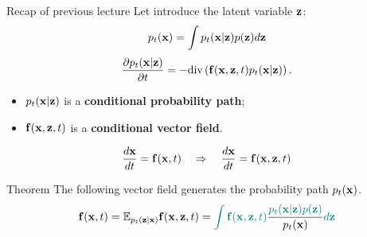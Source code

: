 \begin{frame}{Recap of previous lecture}
	\vspace{-0.3cm}
	Let introduce the latent variable $\mathbf{z}$:
	\[
		p_t(\mathbf{x}) = \int p_t(\mathbf{x} | \mathbf{z}) p(\mathbf{z}) d \mathbf{z} 
	\]
	\vspace{-0.5cm}
	\[
		\frac{\partial p_t(\mathbf{x} | \mathbf{z})}{\partial t} = - \text{div}\left(\mathbf{f}(\mathbf{x}, \mathbf{z}, t) p_t(\mathbf{x} | \mathbf{z})\right).
	\]
	\vspace{-0.3cm}
	\begin{itemize}
		\item $p_t(\mathbf{x} | \mathbf{z})$ is a \textbf{conditional probability path};
		\item $\mathbf{f}(\mathbf{x}, \mathbf{z}, t)$ is a \textbf{conditional vector field}.
	\end{itemize}
	\[
		\frac{d\mathbf{x}}{dt} = \mathbf{f}(\mathbf{x}, t) \quad \Rightarrow \quad \frac{d\mathbf{x}}{dt} = \mathbf{f}(\mathbf{x}, \mathbf{z}, t)
	\]
	\vspace{-0.5cm}
	\begin{block}{Theorem}
		The following vector field generates the probability path $p_t(\mathbf{x})$.
		\vspace{-0.2cm}
		\[
			\mathbf{f}(\mathbf{x}, t) = \mathbb{E}_{p_t(\mathbf{z} | \mathbf{x})} \mathbf{f}(\mathbf{x}, \mathbf{z}, t)  = {\color{teal}\int \mathbf{f}(\mathbf{x}, \mathbf{z}, t)} \frac{\color{teal}p_t(\mathbf{x} | \mathbf{z}) p(\mathbf{z})}{p_t(\mathbf{x})} {\color{teal}d \mathbf{z}}
		\]
		\vspace{-0.5cm}
	\end{block}
\end{frame}
